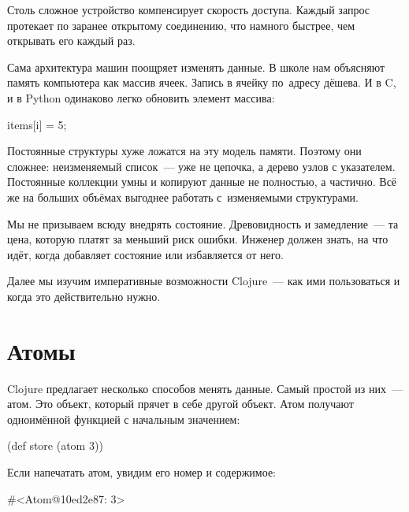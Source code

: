 Столь сложное устройство компенсирует скорость доступа. Каждый запрос протекает
по заранее открытому соединению, что намного быстрее, чем открывать его каждый
раз.

Сама архитектура машин поощряет изменять данные. В школе нам объясняют память
компьютера как массив ячеек. Запись в ячейку по~адресу дёшева. И в C\Plus\Plus,
и в Python одинаково легко обновить элемент массива:

\begin{english}
  \begin{python}
items[i] = 5;
  \end{python}
\end{english}

Постоянные структуры хуже ложатся на эту модель памяти. Поэтому они сложнее:
неизменяемый список~--- уже не цепочка, а дерево узлов с указателем. Постоянные
коллекции умны и копируют данные не полностью, а частично. Всё же на больших
объёмах выгоднее работать с~изменяемыми структурами.

Мы не призываем всюду внедрять состояние. Древовидность и замедление~--- та
цена, которую платят за меньший риск ошибки. Инженер должен знать, на что идёт,
когда добавляет состояние или избавляется от него.

Далее мы изучим императивные возможности Clojure~--- как ими пользоваться и
когда это действительно нужно.

\section{Атомы}


Clojure предлагает несколько способов менять данные. Самый простой из них~---
атом. Это объект, который прячет в себе другой объект. Атом получают одноимённой
функцией с начальным значением:

\begin{english}
  \begin{clojure}
(def store (atom 3))
  \end{clojure}
\end{english}

Если напечатать атом, увидим его номер и содержимое:

\begin{english}
  \begin{clojure}
#<Atom@10ed2e87: 3>
  \end{clojure}
\end{english}

